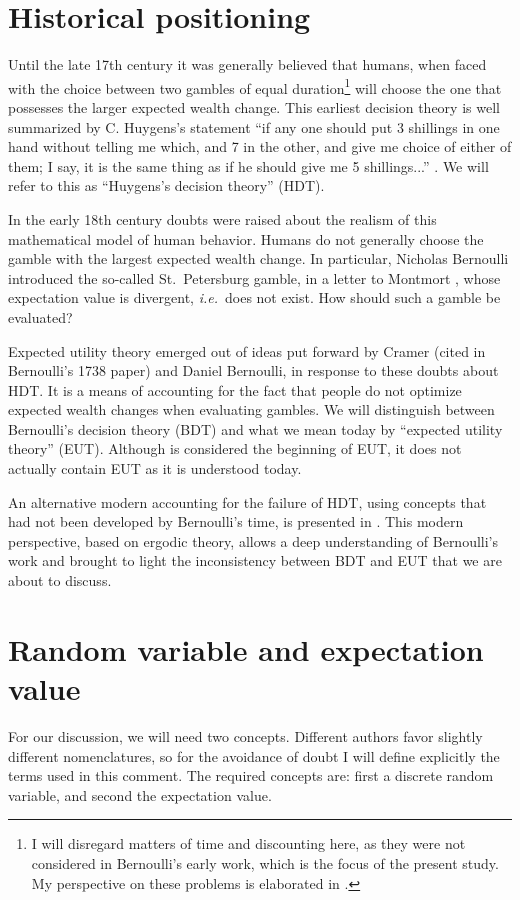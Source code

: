 \documentclass[pdftex]{article}
\newcommand{\ie}{{\it i.e.}\ }
\newcommand{\seclabel}[1]{\label{section:#1}}
\begin{document}
\section{Historical positioning}
\seclabel{Historical}
Until the late 17th century it was generally believed that humans, when faced with the choice between two gambles of equal duration\footnote{I will disregard matters of time and discounting here, as they were not considered in Bernoulli's early work, which is the focus of the present study. My perspective on these problems is elaborated in \cite{PetersGell-Mann2016}.} will choose the one that possesses the larger expected wealth change. This earliest decision theory is well summarized by C. Huygens's statement ``if any one should put 3 shillings in one hand without telling me which, and 7 in the other, and give me choice of either of them; I say, it is the same thing as if he should give me 5 shillings...'' \cite{Huygens1657}. We will refer to this as ``Huygens's decision theory'' (HDT). 

In the early 18th century doubts were raised about the realism of this mathematical model of human behavior. Humans do not generally choose the gamble with the largest expected wealth change. In particular, Nicholas Bernoulli introduced the so-called St.~Petersburg gamble, in a letter to Montmort \cite[p.~402]{Montmort1713}, whose expectation value is divergent, \ie does not exist. How should such a gamble be evaluated?

Expected utility theory emerged out of ideas put forward by Cramer (cited in Bernoulli's 1738 paper) and Daniel Bernoulli, in response to these doubts about HDT. It is a means of accounting for the fact that people do not optimize expected wealth changes when evaluating gambles. We will distinguish between Bernoulli's decision theory (BDT) and what we mean today by ``expected utility theory'' (EUT). Although \cite{Bernoulli1738} is considered the beginning of EUT, it does not actually contain EUT as it is understood today.

An alternative modern accounting for the failure of HDT, using concepts that had not been developed by Bernoulli's time, is presented in \cite{PetersGell-Mann2016}. This modern perspective, based on ergodic theory, allows a deep understanding of Bernoulli's work and brought to light the inconsistency between BDT and EUT that we are about to discuss.

\section{Random variable and expectation value}
\seclabel{Mathematical}
For our discussion, we will need two concepts. Different authors favor slightly different nomenclatures, so for the avoidance of doubt I will define explicitly the terms used in this comment. The required concepts are: first a discrete random variable, and second the expectation value. 
\end{document}
